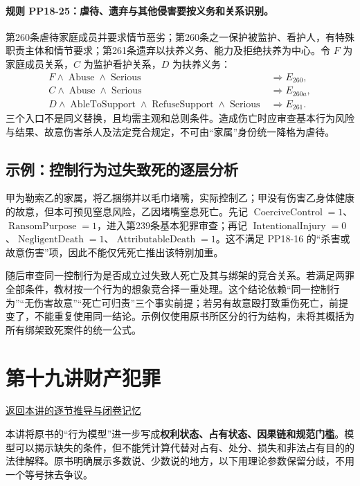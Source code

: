 \paragraph{规则 PP18-25：虐待、遗弃与其他侵害要按义务和关系识别。}
\mbox{}\par
第260条虐待家庭成员并要求情节恶劣；第260条之一保护被监护、看护人，有特殊职责主体和情节要求；第261条遗弃以扶养义务、能力及拒绝扶养为中心。令 $F$ 为家庭成员关系，$C$ 为监护看护关系，$D$ 为扶养义务：
\[
\begin{aligned}
F\land\operatorname{Abuse}\land\operatorname{Serious}&\Rightarrow E_{260},\\
C\land\operatorname{Abuse}\land\operatorname{Serious}&\Rightarrow E_{260a},\\
D\land\operatorname{AbleToSupport}\land\operatorname{RefuseSupport}
\land\operatorname{Serious}&\Rightarrow E_{261}.
\end{aligned}
\]
三个入口不是同义替换，且均需主观和总则条件。造成伤亡时应审查基本行为风险与结果、故意伤害杀人及法定竞合规定，不可由“家属”身份统一降格为虐待。

\subsection{示例：控制行为过失致死的逐层分析}
甲为勒索乙的家属，将乙捆绑并以毛巾堵嘴，实际控制乙；甲没有伤害乙身体健康的故意，但本可预见窒息风险，乙因堵嘴窒息死亡。先记 $\operatorname{CoerciveControl}=1$、$\operatorname{RansomPurpose}=1$，进入第239条基本犯罪审查；再记 $\operatorname{IntentionalInjury}=0$、$\operatorname{NegligentDeath}=1$、$\operatorname{AttributableDeath}=1$。这不满足 PP18-16 的“杀害或故意伤害”项，因此不能仅凭死亡推出该特别加重。

随后审查同一控制行为是否成立过失致人死亡及其与绑架的竞合关系。若满足两罪全部条件，教材按一个行为的想象竞合择一重处理。这个结论依赖“同一控制行为”“无伤害故意”“死亡可归责”三个事实前提；若另有故意殴打致重伤死亡，前提变了，不能重复使用同一结论。示例仅使用原书所区分的行为结构，未将其概括为所有绑架致死案件的统一公式。

\section{第十九讲\quad 财产犯罪}

\label{ref:lecture:19}

\noindent\hyperref[lecture:19]{返回本讲的逐节推导与闭卷记忆}

本讲将原书的“行为模型”进一步写成\textbf{权利状态、占有状态、因果链和规范门槛}。模型可以揭示缺失的条件，但不能凭计算代替对占有、处分、损失和非法占有目的的法律解释。原书明确展示多数说、少数说的地方，以下用理论参数保留分歧，不用一个等号抹去争议。

